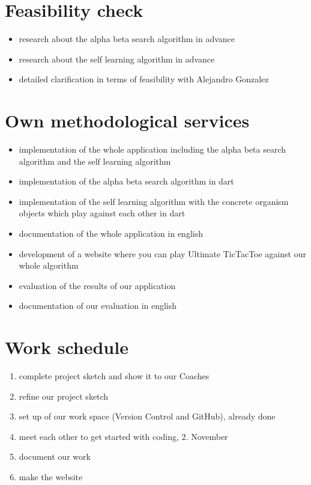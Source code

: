 \section{Feasibility check}
\begin{itemize}
    \item research about the alpha beta search algorithm in advance
    \item research about the self learning algorithm in advance
    \item detailed clarification in terms of feasibility with Alejandro Gonzalez
\end{itemize}

\section{Own methodological services}
\begin{itemize}
	\item implementation of the whole application including the alpha 				beta search algorithm and the self learning algorithm
	\item implementation of the alpha beta search algorithm in dart 
	\item implementation of the self learning algorithm with the concrete organism objects 	which play against each other in dart
	\item documentation of the whole application in english
	\item development of a website where you can play Ultimate TicTacToe against our whole algorithm
	\item evaluation of the results of our application
	\item documentation of our evaluation in english
\end{itemize}

\section{Work schedule}
\begin{enumerate}
    \item complete project sketch and show it to our Coaches
    \item refine our project sketch
    \item set up of our work space (Version Control and GitHub), already done
    \item meet each other to get started with coding, 2. November
    \item document our work
    \item make the website
\end{enumerate}


